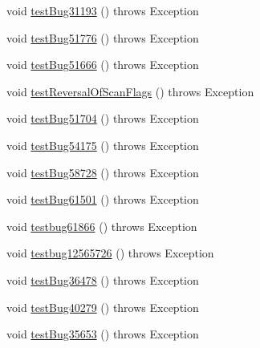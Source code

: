 \begin{DoxyCompactItemize}
\item 
void \mbox{\hyperlink{classtestsuite_1_1regression_1_1_statement_regression_test_acb243998243ec453cce2912cb437279a}{test\+Bug31193}} ()  throws Exception 
\item 
void \mbox{\hyperlink{classtestsuite_1_1regression_1_1_statement_regression_test_a53b1501aa3242f209e129d5301ff41e3}{test\+Bug51776}} ()  throws Exception 
\item 
void \mbox{\hyperlink{classtestsuite_1_1regression_1_1_statement_regression_test_affea712708c029d9255571ae4e846211}{test\+Bug51666}} ()  throws Exception 
\item 
void \mbox{\hyperlink{classtestsuite_1_1regression_1_1_statement_regression_test_ad4bbddf70349aa2cdb9eeea4302f85c9}{test\+Reversal\+Of\+Scan\+Flags}} ()  throws Exception 
\item 
void \mbox{\hyperlink{classtestsuite_1_1regression_1_1_statement_regression_test_ae340966f884a71e95d8ff3df860c27e6}{test\+Bug51704}} ()  throws Exception 
\item 
void \mbox{\hyperlink{classtestsuite_1_1regression_1_1_statement_regression_test_a58e585594c886a2bc7d1179b9be2d1c2}{test\+Bug54175}} ()  throws Exception 
\item 
void \mbox{\hyperlink{classtestsuite_1_1regression_1_1_statement_regression_test_a84dc5a1748d9651df8f09ae7b8e2fd2b}{test\+Bug58728}} ()  throws Exception 
\item 
void \mbox{\hyperlink{classtestsuite_1_1regression_1_1_statement_regression_test_a9a35d52eb464cf7089e61c04944d9c4d}{test\+Bug61501}} ()  throws Exception 
\item 
void \mbox{\hyperlink{classtestsuite_1_1regression_1_1_statement_regression_test_a8cccba0c2f85f3a64228f15cb1973073}{testbug61866}} ()  throws Exception 
\item 
void \mbox{\hyperlink{classtestsuite_1_1regression_1_1_statement_regression_test_a7c42f31415085e3dc5b8531b4f5b1a6d}{testbug12565726}} ()  throws Exception 
\item 
void \mbox{\hyperlink{classtestsuite_1_1regression_1_1_statement_regression_test_a683128ef39eee9bd631d50121aa58fc8}{test\+Bug36478}} ()  throws Exception 
\item 
void \mbox{\hyperlink{classtestsuite_1_1regression_1_1_statement_regression_test_adcee0bfb85026b28841f5a0cd08125a2}{test\+Bug40279}} ()  throws Exception 
\item 
void \mbox{\hyperlink{classtestsuite_1_1regression_1_1_statement_regression_test_a40b2d7e9258863dc6ad385628b08e04d}{test\+Bug35653}} ()  throws Exception 

\end{DoxyCompactItemize}
